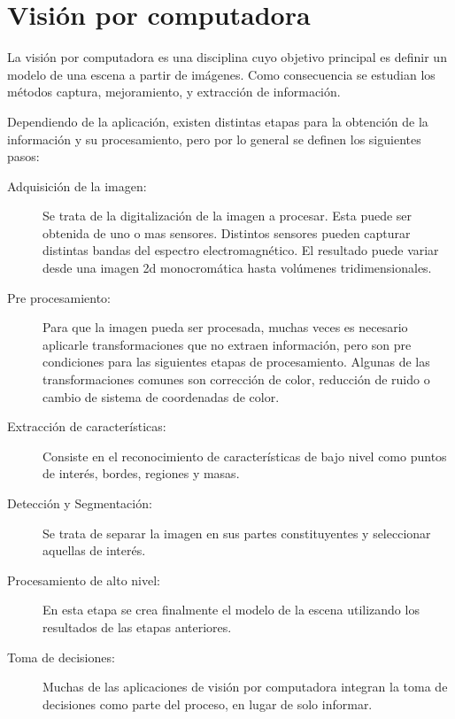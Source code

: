 
\section{Visión por computadora}

La visión por computadora es una disciplina cuyo objetivo principal es definir
un modelo de una escena a partir de imágenes\cite{cvLinda2001}. Como
consecuencia se estudian los métodos captura, mejoramiento, y extracción de
información.

Dependiendo de la aplicación, existen distintas etapas para la obtención de la
información y su procesamiento, pero por lo general se definen los siguientes
pasos\cite{digitalImageProcessing2ed, wikiCV}:

\begin{description}

\item[Adquisición de la imagen:] Se trata de la digitalización de la imagen a
	procesar. Esta puede ser obtenida de uno o mas sensores. Distintos
	sensores pueden capturar distintas bandas del espectro electromagnético.
	El resultado puede variar desde una imagen 2d monocromática hasta
	volúmenes tridimensionales.

\item[Pre procesamiento:] Para que la imagen pueda ser procesada, muchas veces
	es necesario aplicarle transformaciones que no extraen información, pero
	son pre condiciones para las siguientes etapas de procesamiento. Algunas
	de las transformaciones comunes son corrección de color, reducción de
	ruido o cambio de sistema de coordenadas de color.

\item[Extracción de características:] Consiste en el reconocimiento de
	características de bajo nivel como puntos de interés, bordes, regiones y
	masas.

\item[Detección y Segmentación:] Se trata de separar la imagen en sus partes
	constituyentes y seleccionar aquellas de interés.

\item[Procesamiento de alto nivel:] En esta etapa se crea finalmente el modelo
	de la escena utilizando los resultados de las etapas anteriores.

\item[Toma de decisiones:] Muchas de las aplicaciones de visión por computadora
	integran la toma de decisiones como parte del proceso, en lugar de solo
	informar.

\end{description}
